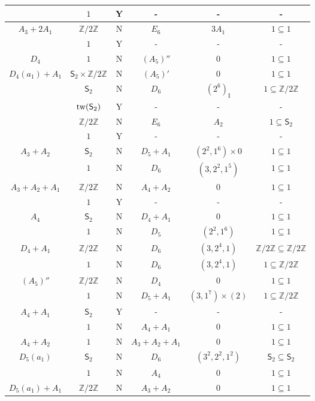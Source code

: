 \documentclass[11pt]{amsart}
\newcommand{\bZ}{{\mathbb Z}}
\newcommand{\I}{{\mathfrak I}}
\renewcommand{\I}{{\operatorname{I}}}
\newcommand{\Sym}{{\mathsf{S}}}
\newcommand{\tw}{{{\mbox{\rm tw}}}}
\numberwithin{equation}{section}
\begin{document}
\begin{center}
\begin{longtable}{|c|c|c|c|c|c|}
			& $1$ & Y & - & - & - \\
			\hline
			$A_3+2A_1$ & $\bZ/2\bZ$ & N & $E_6$ & $3A_1$ & $1\subseteq 1$\\
			& $1$ & Y & - & - & - \\
			\hline
			$D_4$ & $1$ & N & $(A_5)''$ & $0$ & $1\subseteq 1$ \\
			\hline
			$D_4(a_1)+A_1$ & $\Sym_2\times \bZ/2\bZ$ & N & $(A_5)'$ & $0$  & $1\subseteq 1$ \\
			& $\Sym_2$ & N & $D_6$ & $(2^6)_\I$ & $1\subseteq \bZ/2\bZ$ \\
			& $\tw(\Sym_2)$ & Y & - & - & - \\
			& $\bZ/2\bZ$ & N & $E_6$ & $A_2$ & $1\subseteq \Sym_2$ \\
			& $1$ & Y & - & - &  -\\
			\hline
			$A_3+A_2$ & $\Sym_2$ & N & $D_5 + A_1$ & $(2^2,1^6)\times 0$ & $1\subseteq 1$ \\
			& $1$ & N & $D_6$ & $(3,2^2,1^5)$ & $1\subseteq 1$ \\
			\hline
			$A_3+A_2+A_1$ & $\bZ/2\bZ$ & N & $A_4 + A_2$ & $0$ & $1\subseteq 1$ \\
			& $1$ & Y & - & - & - \\
			\hline
			$A_4$ & $\Sym_2$ & N & $D_4 + A_1$ & $0$ &  $1\subseteq 1$\\
			& $1$ & N & $D_5$ & $(2^2,1^6)$ & $1\subseteq 1$ \\
			\hline
			$D_4+A_1$ & $\bZ/2\bZ$ & N & $D_6$ & $(3,2^4,1)$ & $\bZ/2\bZ\subseteq \bZ/2\bZ$ \\
			& $1$ & N & $D_6$ & $(3,2^4,1)$ & $1\subseteq \bZ/2\bZ$ \\
			\hline
			$(A_5)''$ & $\bZ/2\bZ$ & N & $D_4$ & $0$ & $1\subseteq 1$ \\
			& $1$ & N & $D_5 + A_1$ & $(3,1^7)\times (2)$ & $1\subseteq \bZ/2\bZ$\\
			\hline
			$A_4+A_1$ & $\Sym_2$ & Y & - & -  & - \\
			& $1$ & N & $A_4 + A_1$ & 
			$0$ & $1\subseteq 1$\\
			\hline
			$A_4+A_2$ & $1$ & N & $A_3 + A_2 + A_1$ & $0$ & $1\subseteq 1$\\
			\hline
			$D_5(a_1)$ & $\Sym_2$ & N & $D_6$ & $(3^2,2^2,1^2)$ & $\Sym_2\subseteq \Sym_2$ \\
			& $1$ & N & $A_4$ & $0$ & $1\subseteq 1$ \\
			\hline
			$D_5(a_1)+A_1$ & $\bZ/2\bZ$ & N & $A_3 + A_2$ & $0$ & $1\subseteq 1$ \\

\end{longtable}
\end{center}
\end{document}
